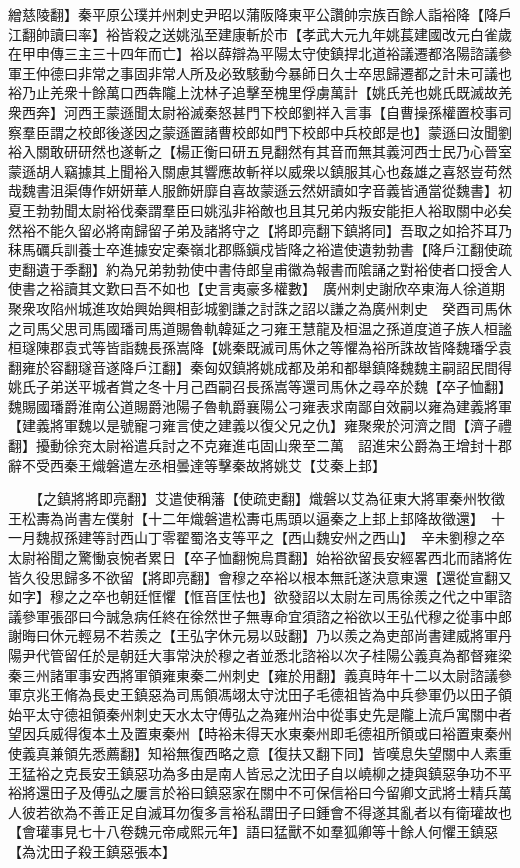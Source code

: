 繒慈陵翻】秦平原公璞并州刺史尹昭以蒲阪降東平公讚帥宗族百餘人詣裕降【降戶江翻帥讀曰率】裕皆殺之送姚泓至建康斬於市【孝武大元九年姚萇建國改元白雀歲在甲申傳三主三十四年而亡】裕以薛辯為平陽太守使鎮捍北道裕議遷都洛陽諮議參軍王仲德曰非常之事固非常人所及必致駭動今暴師日久士卒思歸遷都之計未可議也裕乃止羌衆十餘萬口西犇隴上沈林子追擊至槐里俘虜萬計【姚氏羌也姚氏既滅故羌衆西奔】河西王蒙遜聞太尉裕滅秦怒甚門下校郎劉祥入言事【自曹操孫權置校事司察羣臣謂之校郎後遂因之蒙遜置諸曹校郎如門下校郎中兵校郎是也】蒙遜曰汝聞劉裕入關敢研研然也遂斬之【楊正衡曰研五見翻然有其音而無其義河西士民乃心晉室蒙遜胡人竊據其上聞裕入關慮其響應故斬祥以威衆以鎮服其心也姦雄之喜怒豈苟然哉魏書沮渠傳作妍妍華人服飾妍靡自喜故蒙遜云然妍讀如字音義皆通當從魏書】初夏王勃勃聞太尉裕伐秦謂羣臣曰姚泓非裕敵也且其兄弟内叛安能拒人裕取關中必矣然裕不能久留必將南歸留子弟及諸將守之【將即亮翻下鎮將同】吾取之如拾芥耳乃秣馬礪兵訓養士卒進據安定秦嶺北郡縣鎭戍皆降之裕遣使遺勃勃書【降戶江翻使疏吏翻遺于季翻】約為兄弟勃勃使中書侍郎皇甫徽為報書而隂誦之對裕使者口授舍人使書之裕讀其文歎曰吾不如也【史言夷豪多權數】　廣州刺史謝欣卒東海人徐道期聚衆攻陷州城進攻始興始興相彭城劉謙之討誅之詔以謙之為廣州刺史　癸酉司馬休之司馬父思司馬國璠司馬道賜魯軌韓延之刁雍王慧龍及桓温之孫道度道子族人桓謐桓璲陳郡袁式等皆詣魏長孫嵩降【姚秦既滅司馬休之等懼為裕所誅故皆降魏璠孚袁翻雍於容翻璲音遂降戶江翻】秦匈奴鎮將姚成都及弟和都舉鎮降魏魏主嗣詔民間得姚氏子弟送平城者賞之冬十月己酉嗣召長孫嵩等還司馬休之尋卒於魏【卒子恤翻】魏賜國璠爵淮南公道賜爵池陽子魯軌爵襄陽公刁雍表求南鄙自效嗣以雍為建義將軍【建義將軍魏以是號寵刁雍言使之建義以復父兄之仇】雍聚衆於河濟之間【濟子禮翻】擾動徐兖太尉裕遣兵討之不克雍進屯固山衆至二萬　詔進宋公爵為王增封十郡辭不受西秦王熾磐遣左丞相曇達等擊秦故將姚艾【艾秦上邽】

　　【之鎮將將即亮翻】艾遣使稱藩【使疏吏翻】熾磐以艾為征東大將軍秦州牧徵王松夀為尚書左僕射【十二年熾磐遣松夀屯馬頭以逼秦之上邽上邽降故徵還】　十一月魏叔孫建等討西山丁零翟蜀洛支等平之【西山魏安州之西山】　辛未劉穆之卒太尉裕聞之驚慟哀惋者累日【卒子恤翻惋烏貫翻】始裕欲留長安經畧西北而諸將佐皆久役思歸多不欲留【將即亮翻】會穆之卒裕以根本無託遂決意東還【還從宣翻又如字】穆之之卒也朝廷恇懼【恇音匡怯也】欲發詔以太尉左司馬徐羨之代之中軍諮議參軍張邵曰今誠急病任終在徐然世子無專命宜須諮之裕欲以王弘代穆之從事中郎謝晦曰休元輕易不若羨之【王弘字休元易以䜴翻】乃以羨之為吏部尚書建威將軍丹陽尹代管留任於是朝廷大事常決於穆之者並悉北諮裕以次子桂陽公義真為都督雍梁秦三州諸軍事安西將軍領雍東秦二州刺史【雍於用翻】義真時年十二以太尉諮議參軍京兆王脩為長史王鎮惡為司馬領馮翊太守沈田子毛德祖皆為中兵參軍仍以田子領始平太守德祖領秦州刺史天水太守傅弘之為雍州治中從事史先是隴上流戶寓關中者望因兵威得復本土及置東秦州【時裕未得天水東秦州即毛德祖所領或曰裕置東秦州使義真兼領先悉薦翻】知裕無復西略之意【復扶又翻下同】皆嘆息失望關中人素重王猛裕之克長安王鎮惡功為多由是南人皆忌之沈田子自以嶢柳之捷與鎮惡争功不平裕將還田子及傅弘之屢言於裕曰鎮惡家在關中不可保信裕曰今留卿文武將士精兵萬人彼若欲為不善正足自滅耳勿復多言裕私謂田子曰鍾會不得遂其亂者以有衛瓘故也【會瓘事見七十八卷魏元帝咸熙元年】語曰猛獸不如羣狐卿等十餘人何懼王鎮惡【為沈田子殺王鎮惡張本】

